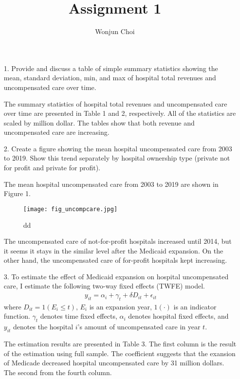 \documentclass[12pt]{article}
\title{Assignment 1}
\author{Wonjun Choi}
\begin{document}
\maketitle
	\begin{itemize}
		\item[1.] Provide and discuss a table of simple summary statistics showing the mean, standard deviation, min, and max of hospital total revenues and uncompensated care over time.
		
		The summary statistics of hospital total revenues and uncompensated care over time are presented in Table 1 and 2, respectively. All of the statistics are scaled by million dollar. The tables show that both revenue and uncompensated care are increasing.
		
		
		
		
		
		\item[2.] Create a figure showing the mean hospital uncompensated care from 2003 to 2019. Show this trend separately by hospital ownership type (private not for profit and private for profit).
		
		The mean hospital uncompensated care from 2003 to 2019 are shown in Figure 1.
		\begin{figure} [ht]
			\centering
			\texttt{[image: fig\_uncompcare.jpg]}
			\caption{dd}
		\end{figure}
		The uncompensated care of not-for-profit hospitals increased until 2014, but it seems it stays in the similar level after the Medicaid expansion. On the other hand, the uncompensated care of for-profit hospitals kept increasing.
		
		\item[3.] To estimate the effect of  Medicaid expansion on hospital uncompensated care, I estimate the following two-way fixed effects (TWFE) model.
		\begin{eqnarray}
			y_{it} = \alpha_i + \gamma_t + \delta D_{it} + \epsilon_{it}
		\end{eqnarray}
	    where $D_{it} = 1(E_i \le t)$, $E_i$ is an expansion year, $1(\cdot)$ is an indicator function. $\gamma_t$ denotes time fixed effects, $\alpha_i$ denotes hospital fixed effects, and $y_{it}$ denotes the hospital $i$’s amount of uncompensated care in year $t$.
	    
	    
	    
	    The estimation results are presented in Table 3.  The first column is the result of the estimation using full sample. The coefficient suggests that the exansion of Medicade decreased hospital uncompensated care by 31 million dollars. The second from the fourth column.
	    		

\end{itemize}
\end{document}
